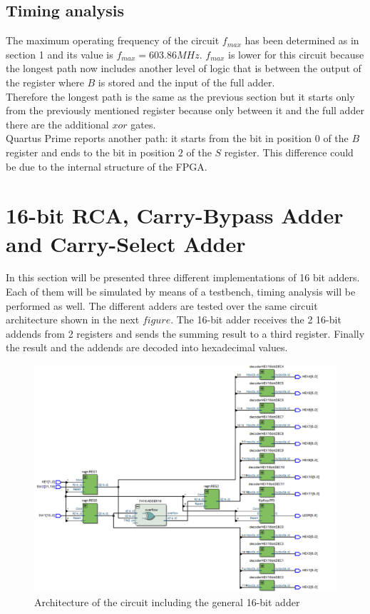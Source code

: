 \documentclass[12pt]{article}
\begin{document}
\subsection{Timing analysis}
The maximum operating frequency of the circuit $f_{max}$ has been determined  as in section 1 and its value is $f_{max}=603.86MHz$. $f_{max}$ is lower for this circuit because the longest path now includes another level of logic that  is between the output of the register where $B$ is stored and the input of the full adder. \\
Therefore the longest path is the same as the previous section but it starts only from the previously mentioned register because only between  it and the full adder there are the additional $xor$ gates.\\
Quartus Prime reports another path: it starts from the bit in position $0$ of the $B$ register and ends to the bit in position $2$ of the $S$ register. This difference could be due to the internal structure of the FPGA.

\newpage
\section{ 16-bit RCA, Carry-Bypass Adder and Carry-Select Adder }

In this section will be presented three different implementations of 16 bit adders. 
Each of them will be simulated by means of a testbench, timing analysis will be performed as well. 
The different adders are tested over the same circuit architecture shown in the next $figure$. The 16-bit adder receives the 2 16-bit addends from 2 registers and sends the summing result to a third register. Finally the result and the addends are decoded into hexadecimal values.
\newline
\newline

\begin{figure}[h]
	\centering
	\includegraphics[scale = 0.6]{immagini/niki/rtlgeneral.png}
	\caption{Architecture of the circuit including the general 16-bit adder}       
	
\end{figure}
\newpage
\end{document}
